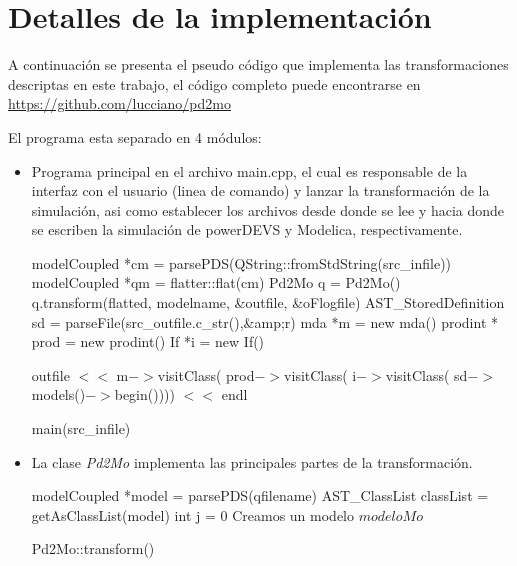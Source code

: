 \documentclass[a4paper,	11pt]{report}
\begin{document}
\chapter{Detalles de la implementación}
A continuación se presenta el pseudo código que implementa las transformaciones descriptas en este trabajo, el código completo puede encontrarse en \url{https://github.com/lucciano/pd2mo}

El programa esta separado en 4 módulos:
\begin{itemize}
\item Programa principal en el archivo main.cpp, el cual es responsable de la interfaz con el usuario (linea de comando) y lanzar la transformación de la simulación, asi como establecer los archivos desde donde se lee y hacia donde se escriben la simulación de powerDEVS y Modelica, respectivamente.


\begin{function*}[H]
 modelCoupled *cm = parsePDS(QString::fromStdString(src\_infile))\;
 modelCoupled *qm = flatter::flat(cm)\;
 Pd2Mo q = Pd2Mo()\;
 q.transform(flatted, modelname, \&outfile, \&oFlogfile)\;
 AST\_StoredDefinition sd = parseFile(src\_outfile.c\_str(),\&amp;r)\;
 mda *m = new mda()\;
 prodint *  prod = new prodint()\;
 If *i = new If()\;
 
 outfile $<<$ m$->$visitClass( 
 	prod$->$visitClass( 
 		i$->$visitClass( 
 		\*sd$->$models()$->$begin()))) $<<$ endl\;
 \caption{main(src\_infile)}
\end{function*}

\newpage
\item La clase \emph{Pd2Mo} implementa las principales partes de la transformación.

\begin{function}[H]
 modelCoupled *model = parsePDS(qfilename)\;
 AST\_ClassList classList = getAsClassList(model)\; 
 int j = 0\;
 Creamos un modelo $modeloMo$\;
 

 \caption{Pd2Mo::transform()}
\end{function}


\end{itemize}
\end{document}
